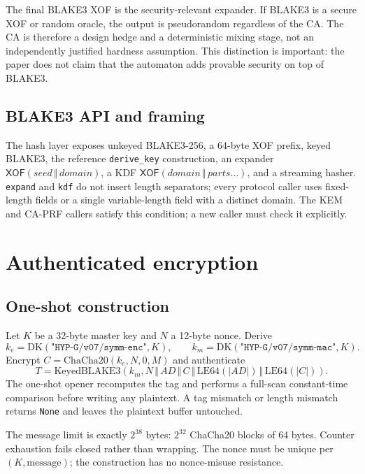 \documentclass[11pt,a4paper]{article}
\theoremstyle{plain}
\theoremstyle{definition}
\theoremstyle{remark}
\newcommand{\concat}{\,\Vert\,}
\newcommand{\XOF}{\mathsf{XOF}}
\begin{document}
The final BLAKE3 XOF is the security-relevant expander.  If BLAKE3 is a
secure XOF or random oracle, the output is pseudorandom regardless of
the CA.  The CA is therefore a design hedge and a deterministic mixing
stage, not an independently justified hardness assumption.  This
distinction is important: the paper does not claim that the automaton
adds provable security on top of BLAKE3.

\subsection{BLAKE3 API and framing}

The hash layer exposes unkeyed BLAKE3-256, a 64-byte XOF prefix, keyed
BLAKE3, the reference \texttt{derive\_key} construction, an expander
$\XOF(\mathit{seed}\concat\mathit{domain})$, a KDF
$\XOF(\mathit{domain}\concat\mathit{parts}\ldots)$, and a streaming
hasher.  \texttt{expand} and \texttt{kdf} do not insert length
separators; every protocol caller uses fixed-length fields or a single
variable-length field with a distinct domain.  The KEM and CA-PRF
callers satisfy this condition; a new caller must check it explicitly.

\section{Authenticated encryption}
\label{sec:aead}

\subsection{One-shot construction}

Let $K$ be a 32-byte master key and $N$ a 12-byte nonce.  Derive
\[
 k_e=\mathrm{DK}(\texttt{"HYP-G/v07/symm-enc"},K),\qquad
 k_m=\mathrm{DK}(\texttt{"HYP-G/v07/symm-mac"},K).
\]
Encrypt $C=\mathrm{ChaCha20}(k_e,N,0,M)$ and authenticate
\[
 T=\mathrm{KeyedBLAKE3}(k_m,
 N\concat AD\concat C\concat\mathrm{LE64}(|AD|)\concat
 \mathrm{LE64}(|C|)).
\]
The one-shot opener recomputes the tag and performs a full-scan
constant-time comparison before writing any plaintext.  A tag mismatch
or length mismatch returns \texttt{None} and leaves the plaintext buffer
untouched.

The message limit is exactly $2^{38}$ bytes: $2^{32}$ ChaCha20 blocks of
64 bytes.  Counter exhaustion fails closed rather than wrapping.  The
nonce must be unique per $(K,\text{message})$; the construction has no
nonce-misuse resistance.
\end{document}
